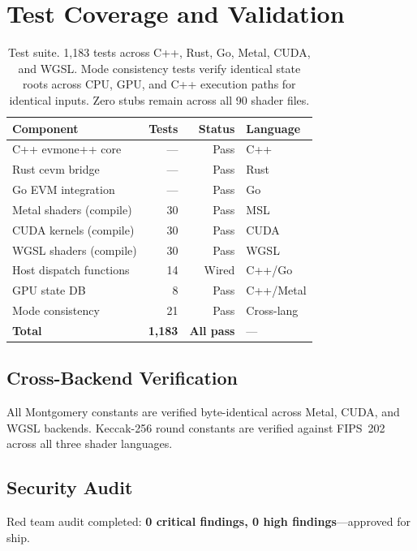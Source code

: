 \section{Test Coverage and Validation}

\label{sec:tests}

\begin{table}[h]
\centering
\small
\begin{tabular}{lrrl}
\toprule
\textbf{Component} & \textbf{Tests} & \textbf{Status} & \textbf{Language} \\
\midrule
C++ evmone++ core        & ---  & Pass & C++ \\
Rust cevm bridge          & ---  & Pass & Rust \\
Go EVM integration        & ---  & Pass & Go \\
Metal shaders (compile)   & 30   & Pass & MSL \\
CUDA kernels (compile)    & 30   & Pass & CUDA \\
WGSL shaders (compile)    & 30   & Pass & WGSL \\
Host dispatch functions    & 14   & Wired & C++/Go \\
GPU state DB              & 8    & Pass & C++/Metal \\
Mode consistency          & 21   & Pass & Cross-lang \\
\midrule
\textbf{Total}            & \textbf{1{,}183} & \textbf{All pass} & --- \\
\bottomrule
\end{tabular}
\caption{Test suite. 1{,}183 tests across C++, Rust, Go, Metal, CUDA, and WGSL.
Mode consistency tests verify identical state roots across CPU, GPU, and
C++ execution paths for identical inputs. Zero stubs remain across all 90 shader files.}
\label{tab:tests}
\end{table}

\subsection{Cross-Backend Verification}

All Montgomery constants are verified byte-identical across Metal, CUDA, and WGSL backends.
Keccak-256 round constants are verified against FIPS~202 across all three shader languages.

\subsection{Security Audit}

Red team audit completed: \textbf{0 critical findings, 0 high findings}---approved for ship.

